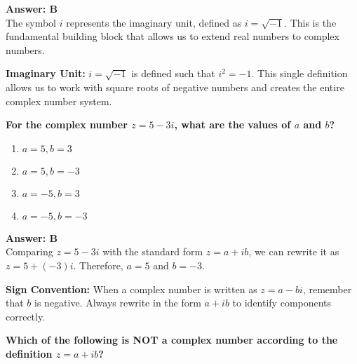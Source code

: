 \documentclass[12pt,a4paper]{article}
\begin{document}
\begin{answerstyle}
\textbf{Answer: B} \\
The symbol \( i \) represents the imaginary unit, defined as \( i = \sqrt{-1} \). This is the fundamental building block that allows us to extend real numbers to complex numbers.
\end{answerstyle}

\begin{conceptbox}
\textbf{Imaginary Unit:} \( i = \sqrt{-1} \) is defined such that \( i^2 = -1 \). This single definition allows us to work with square roots of negative numbers and creates the entire complex number system.
\end{conceptbox}

\newpage
\begin{questiontitle}[MCQ 8]
\textbf{For the complex number \( z = 5 - 3i \), what are the values of \( a \) and \( b \)?}
\end{questiontitle}

\begin{partbox}[Options]
\begin{enumerate}[label=\Alph*.]
    \item \( a = 5, b = 3 \)
    \item \( a = 5, b = -3 \)
    \item \( a = -5, b = 3 \)
    \item \( a = -5, b = -3 \)
\end{enumerate}
\end{partbox}

\begin{answerstyle}
\textbf{Answer: B} \\
Comparing \( z = 5 - 3i \) with the standard form \( z = a + ib \), we can rewrite it as \( z = 5 + (-3)i \). Therefore, \( a = 5 \) and \( b = -3 \).
\end{answerstyle}

\begin{conceptbox}
\textbf{Sign Convention:} When a complex number is written as \( z = a - bi \), remember that \( b \) is negative. Always rewrite in the form \( a + ib \) to identify components correctly.
\end{conceptbox}

\newpage
\begin{questiontitle}[MCQ 9]
\textbf{Which of the following is NOT a complex number according to the definition \( z = a + ib \)?}
\end{questiontitle}
\end{document}
